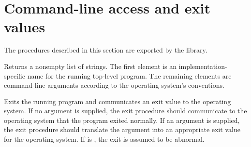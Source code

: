 \chapter{Command-line access and exit values}
\label{programlibchapter}

The procedures described in this section are exported by the
 library.

\begin{entry}{%
}

Returns a nonempty list of strings.
The first element is an implementation-specific
name for the running top-level program.  The remaining elements are command-line
arguments according to the operating system's conventions.
\end{entry}

\begin{entry}{%
}

Exits the running program and communicates an exit value to the 
operating system.  If no argument is supplied, the {\cf exit}
procedure should communicate to the operating system that the program 
exited normally.  If an argument is supplied, the {\cf exit} procedure 
should translate the argument into an appropriate exit value for the 
operating system.  If  is \schfalse{}, the exit is assumed to
be abnormal.
\end{entry}

